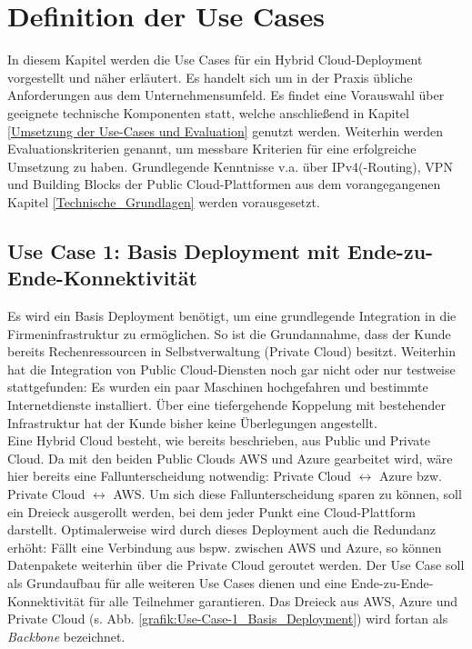 \chapter{Definition der Use Cases} \label{Defintion der Use-Cases}
In diesem Kapitel werden die Use Cases für ein Hybrid Cloud-\gls{Deployment} vorgestellt und näher erläutert. Es handelt sich um in der Praxis übliche Anforderungen aus dem Unternehmensumfeld. Es findet eine Vorauswahl über geeignete technische Komponenten statt, welche anschließend in Kapitel \ref{Umsetzung der Use-Cases und Evaluation} genutzt werden. Weiterhin werden Evaluationskriterien genannt, um messbare Kriterien für eine erfolgreiche Umsetzung zu haben. Grundlegende Kenntnisse v.a. über IPv4(-Routing), \gls{VPN} und Building Blocks der Public Cloud-Plattformen aus dem vorangegangenen Kapitel \ref{Technische_Grundlagen} werden vorausgesetzt.

\section{Use Case 1: Basis Deployment mit Ende-zu-Ende-Konnektivität}\label{base-deployment}
Es wird ein Basis \gls{Deployment} benötigt, um eine grundlegende Integration in die Firmeninfrastruktur zu ermöglichen. So ist die Grundannahme, dass der Kunde bereits Rechenressourcen in Selbstverwaltung (\glqq Private Cloud\grqq{}) besitzt. Weiterhin hat die Integration von Public Cloud-Diensten noch gar nicht oder nur testweise stattgefunden: Es wurden ein paar Maschinen hochgefahren und bestimmte Internetdienste installiert. Über eine tiefergehende Koppelung mit bestehender Infrastruktur hat der Kunde bisher keine Überlegungen angestellt.\\
Eine Hybrid Cloud besteht, wie bereits beschrieben, aus Public und Private Cloud. Da mit den beiden Public Clouds AWS und Azure gearbeitet wird, wäre hier bereits eine Fallunterscheidung notwendig: Private Cloud $\leftrightarrow$ Azure bzw. Private Cloud $\leftrightarrow$ AWS. Um sich diese Fallunterscheidung sparen zu können, soll ein Dreieck ausgerollt werden, bei dem jeder Punkt eine Cloud-Plattform darstellt.
Optimalerweise wird durch dieses \gls{Deployment} auch die Redundanz erhöht: Fällt eine Verbindung aus bspw. zwischen AWS und Azure, so können Datenpakete weiterhin über die Private Cloud geroutet werden.
Der Use Case soll als Grundaufbau für alle weiteren Use Cases dienen und eine Ende-zu-Ende-Konnektivität für alle Teilnehmer garantieren. Das Dreieck aus AWS, Azure und Private Cloud (s. Abb. \ref{grafik:Use-Case-1_Basis_Deployment}) wird fortan als \textit{Backbone} bezeichnet.

